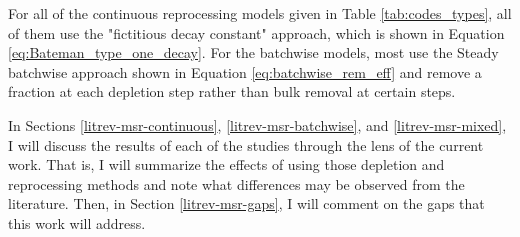 For all of the continuous reprocessing models given in Table \ref{tab:codes_types}, all of them use the "fictitious decay constant" approach, which is shown in Equation \eqref{eq:Bateman_type_one_decay}. For the batchwise models, most use the Steady batchwise approach shown in Equation \eqref{eq:batchwise_rem_eff} and remove a fraction at each depletion step rather than bulk removal at certain steps.




In Sections \ref{litrev-msr-continuous}, \ref{litrev-msr-batchwise}, and \ref{litrev-msr-mixed}, I will discuss the results of each of the studies through the lens of the current work. That is, I will summarize the effects of using those depletion and reprocessing methods and note what differences may be observed from the literature. Then, in Section \ref{litrev-msr-gaps}, I will comment on the gaps that this work will address.

